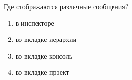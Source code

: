 
Где отображаются различные сообщения?

\begin{enumerate}
    \item в инспекторе
    \item во вкладке иерархии
    \item во вкладке консоль
    \item во вкладке проект
\end{enumerate}

